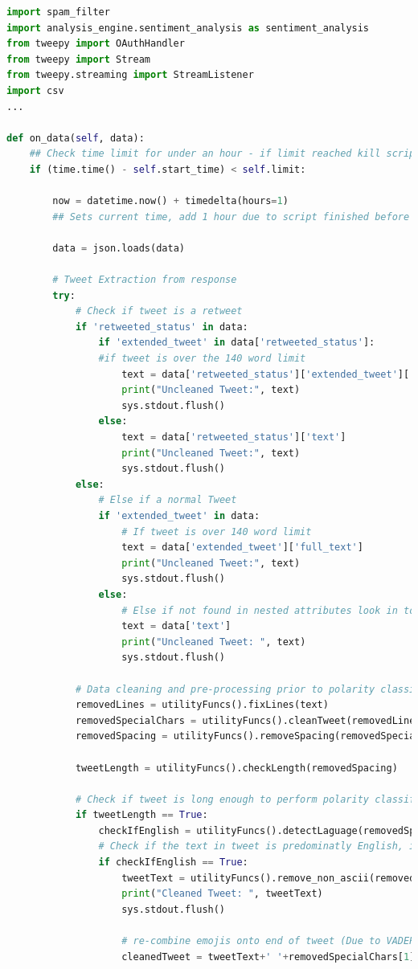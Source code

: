 \documentclass[oneside, 12pt]{article}
\begin{document}
			\begin{lstlisting}[language=python, caption=Tweepy Stream: 'on\_data' method]
import spam_filter
import analysis_engine.sentiment_analysis as sentiment_analysis
from tweepy import OAuthHandler
from tweepy import Stream
from tweepy.streaming import StreamListener
import csv
...
			
def on_data(self, data):
	## Check time limit for under an hour - if limit reached kill script
	if (time.time() - self.start_time) < self.limit:
			
		now = datetime.now() + timedelta(hours=1)
		## Sets current time, add 1 hour due to script finished before the completed hour is finished
			
		data = json.loads(data)
					
		# Tweet Extraction from response
		try:
			# Check if tweet is a retweet
			if 'retweeted_status' in data:
				if 'extended_tweet' in data['retweeted_status']:
				#if tweet is over the 140 word limit
					text = data['retweeted_status']['extended_tweet']['full_text']
					print("Uncleaned Tweet:", text)
					sys.stdout.flush()
				else:
					text = data['retweeted_status']['text']
					print("Uncleaned Tweet:", text)
					sys.stdout.flush()
			else:
				# Else if a normal Tweet
				if 'extended_tweet' in data:
					# If tweet is over 140 word limit
					text = data['extended_tweet']['full_text']
					print("Uncleaned Tweet:", text)
					sys.stdout.flush()
				else:
					# Else if not found in nested attributes look in top-level
					text = data['text']
					print("Uncleaned Tweet: ", text)
					sys.stdout.flush()
			
			# Data cleaning and pre-processing prior to polarity classification
			removedLines = utilityFuncs().fixLines(text)
			removedSpecialChars = utilityFuncs().cleanTweet(removedLines)
			removedSpacing = utilityFuncs().removeSpacing(removedSpecialChars[0])
			
			tweetLength = utilityFuncs().checkLength(removedSpacing)
						
			# Check if tweet is long enough to perform polarity classification on (> 5 words (checked through tokenisation))
			if tweetLength == True:
				checkIfEnglish = utilityFuncs().detectLaguage(removedSpecialChars[0])
				# Check if the text in tweet is predominatly English, if not drop
				if checkIfEnglish == True:
					tweetText = utilityFuncs().remove_non_ascii(removedSpacing)
					print("Cleaned Tweet: ", tweetText)
					sys.stdout.flush()
								
					# re-combine emojis onto end of tweet (Due to VADER supporting emoticon sentiment assignment)
					cleanedTweet = tweetText+' '+removedSpecialChars[1]
			

\end{lstlisting}
\end{document}

